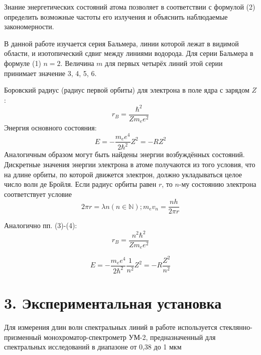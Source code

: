 \documentclass[a4paper,12pt]{report}
\begin{document}
Знание энергетических состояний атома позволяет в соответствии с формулой (2) определить возможные частоты его излучения и объяснить наблюдаемые закономерности. \par
В данной работе изучается серия Бальмера, линии которой лежат в видимой области, и изотопический сдвиг между линиями водорода. Для серии Бальмера в формуле (1) $n = 2$. Величина $m$ для первых четырёх линий этой серии принимает значение 3, 4, 5, 6. \par
Боровский радиус (радиус первой орбиты) для электрона в поле ядра с зарядом $Z$:
\begin{equation}
    r_B = \frac{\hbar^2}{Z m_e e^2}
\end{equation}
Энергия основного состояния:
\begin{equation}
    E = -\frac{m_e e^4}{2 \hbar^2}Z^2 = -R Z^2
\end{equation}
Аналогичным образом могут быть найдены энергии возбуждённых состояний. Дискретные значения энергии электрона в атоме получаются из того условия, что на длине орбиты, по которой движется электрон, должно укладываться целое число волн де Бройля. Если радиус орбиты равен $r$, то $n$-му состоянию электрона соответствует условие 
\begin{equation}
    2 \pi r = \lambda n (n \in \mathbb{N}) ; m_e v_n = \frac{nh}{2 \pi r}
\end{equation}

Аналогично пп. (3)-(4):
\begin{equation}
     r_B = \frac{n^2 \hbar^2}{Z m_e e^2}
\end{equation}

\begin{equation}
    E = -\frac{m_e e^4}{2 \hbar^2} \frac{1}{n^2} Z^2 = -R \frac{Z^2}{n^2}
\end{equation}

\section*{3. Экспериментальная установка}
Для измерения длин волн спектральных линий в работе используется стеклянно-призменный монохроматор-спектрометр УМ-2, предназначенный для спектральных исследований в диапазоне от 0,38 до 1 мкм
\end{document}
